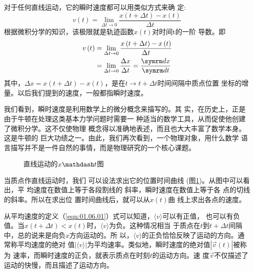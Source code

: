 对于任何直线运动，它的瞬时速度都可以用类似方式来确
定:
\begin{equation*}
  v\left(t\right)=\lim _{\Delta t \rightarrow 0} \frac{x\left(t+\Delta t\right)-x\left(t\right)}{\Delta t}
\end{equation*}
根据微积分学的知识，该极限就是轨迹函数$x\left(t\right)$对时间t的一阶
导数。即
\begin{equation}
  \begin{aligned}
    v\left(t\right) & =\lim _{\Delta t \rightarrow 0} \frac{x\left(t+\Delta t\right)-x\left(t\right)}{\Delta t}            \\
                    & =\lim _{\Delta t \rightarrow 0} \frac{\Delta x}{\Delta t}=\frac{\dif x}{\dif t} \label{eqn:01.06.03}
  \end{aligned}
\end{equation}
其中，$\Delta x=x\left(t+\Delta t\right)-x\left(t\right)$，是在$t\rightarrow t+\Delta t$时间间隔中质点位置
坐标的增量。以后我们提到的速度，一般都指瞬时速度。

我们看到，瞬时速度是利用数学上的微分概念来描写的。其
实，在历史上，正是由于牛顿在处理这类基本力学问题时需要一
种适当的数学工具，从而促使他创建了微积分学。这不仅使物理
概念得以准确地表述，而且也大大丰富了数学本身。这是牛顿的
巨大功绩之一。由此，我们再次看到，一个物理对象，用什么数学
语言描写并不是一件自然的事情，而是物理研究的一个核心课题。

\begin{wrapfigure}[10]{r}{13em}
  \small \vspace{-1.2em}
  \centering
  \caption{直线运动的$x \mathdash t$图}
  \label{fig:01.10}
\end{wrapfigure}
当质点作直线运动时，我们
可以设法求出它的位置时间曲线
(图\ref{fig:01.10})。从图中可以看出，平
均速度在数值上等于各段割线的
斜率，瞬时速度在数值上等于各
点的切线的斜率。所以在求出位
置时间曲线后，就可以从$x\left(t\right)$曲
线上求出各点的速度。

从平均速度的定义（\ref{eqn:01.06.01}）式可以知道，$\langle v\rangle$可以有正值，
也可以有负值。当$x\left(t+\Delta t\right)<x\left(t\right)$时，$\langle v\rangle$为负。这种情况相当
于质点在$t$到$t+\Delta t$间隔中，总的说来是向负$x$方向运动的。所
以，$\langle v\rangle$的正负恰恰反映了运动的方向。通常称平均速度的绝对
值$|\langle v\rangle|$为平均速率。类似地，瞬时速度的绝对值$|\vec{v}\left(t\right)|$被称为
速率，而瞬时速度的正负，就表示质点在时刻$t$的运动方向。速
度$\vec{v}$不仅描述了运动的快慢，而且描述了运动方向。